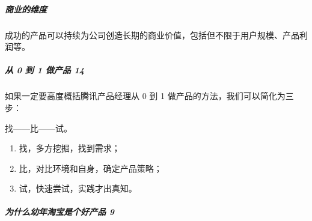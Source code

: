 \documentclass[letterpaper,11pt,english]{sphinxmanual}
\begin{document}
\subparagraph{商业的维度}
\label{\detokenize{chapter_introduction/Product:id12}}
成功的产品可以持续为公司创造长期的商业价值，包括但不限于用户规模、产品利润等。


\subparagraph{从 0 到 1 做产品 14\sphinxfootnotemark[21]}
\label{\detokenize{chapter_introduction/Product:id13}}%
\begin{footnotetext}[21]\sphinxAtStartFootnote
{}
%
\end{footnotetext}\ignorespaces 
如果一定要高度概括腾讯产品经理从 0 到 1
做产品的方法，我们可以简化为三步：

找——比——试。
\begin{enumerate}
%
\item {} 
找，多方挖掘，找到需求；

\item {} 
比，对比环境和自身，确定产品策略；

\item {} 
试，快速尝试，实践才出真知。

\end{enumerate}


\subparagraph{为什么幼年淘宝是个好产品 9\sphinxfootnotemark[22]}
\label{\detokenize{chapter_introduction/Product:id14}}%
\begin{footnotetext}[22]\sphinxAtStartFootnote
{}
%
\end{footnotetext}\ignorespaces 
\end{document}
